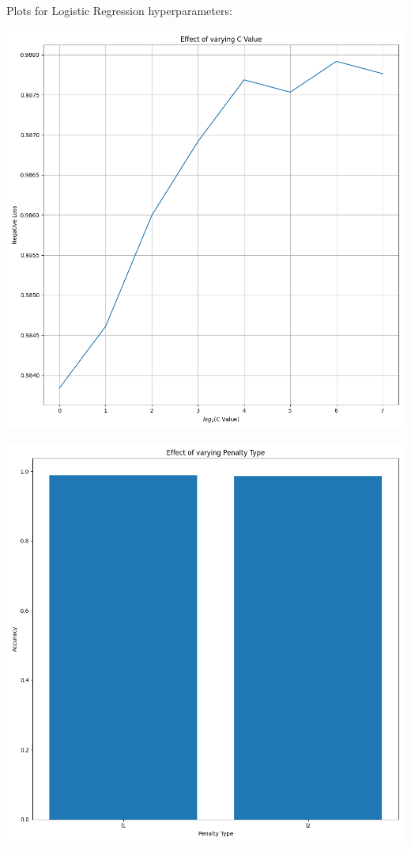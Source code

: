 \documentclass[12pt, letterpaper]{article}
\begin{document}
Plots for Logistic Regression hyperparameters:

\includegraphics[scale=\myscale]{logistic_regression_C Value.png}

\includegraphics[scale=\myscale]{logistic_regression_Penalty Type.png}
\end{document}
